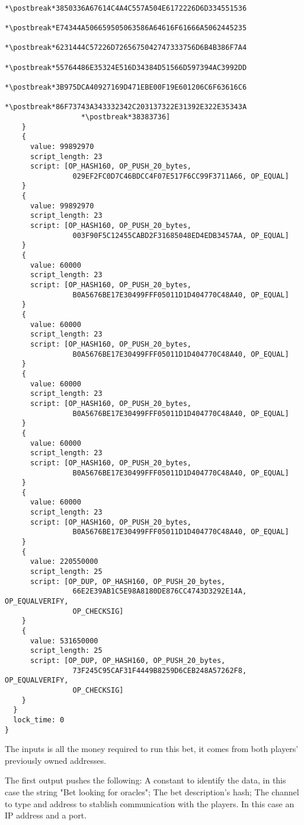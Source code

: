 \begin{lstlisting}
                  *\postbreak*3850336A67614C4A4C557A504E6172226D6D334551536
                  *\postbreak*E74344A506659505063586A64616F61666A5062445235
                  *\postbreak*6231444C57226D7265675042747333756D6B4B386F7A4
                  *\postbreak*55764486E35324E516D34384D51566D597394AC3992DD
                  *\postbreak*3B975DCA40927169D471EBE00F19E601206C6F63616C6
                  *\postbreak*86F73743A343332342C203137322E31392E322E35343A
                  *\postbreak*38383736]
    }
    {
      value: 99892970
      script_length: 23
      script: [OP_HASH160, OP_PUSH_20_bytes,
                029EF2FC0D7C46BDCC4F07E517F6CC99F3711A66, OP_EQUAL]
    }
    {
      value: 99892970
      script_length: 23
      script: [OP_HASH160, OP_PUSH_20_bytes,
                003F90F5C12455CABD2F31685048ED4EDB3457AA, OP_EQUAL]
    }
    {
      value: 60000
      script_length: 23
      script: [OP_HASH160, OP_PUSH_20_bytes,
                B0A5676BE17E30499FFF05011D1D404770C48A40, OP_EQUAL]
    }
    {
      value: 60000
      script_length: 23
      script: [OP_HASH160, OP_PUSH_20_bytes,
                B0A5676BE17E30499FFF05011D1D404770C48A40, OP_EQUAL]
    }
    {
      value: 60000
      script_length: 23
      script: [OP_HASH160, OP_PUSH_20_bytes,
                B0A5676BE17E30499FFF05011D1D404770C48A40, OP_EQUAL]
    }
    {
      value: 60000
      script_length: 23
      script: [OP_HASH160, OP_PUSH_20_bytes,
                B0A5676BE17E30499FFF05011D1D404770C48A40, OP_EQUAL]
    }
    {
      value: 60000
      script_length: 23
      script: [OP_HASH160, OP_PUSH_20_bytes,
                B0A5676BE17E30499FFF05011D1D404770C48A40, OP_EQUAL]
    }
    {
      value: 220550000
      script_length: 25
      script: [OP_DUP, OP_HASH160, OP_PUSH_20_bytes,
                66E2E39AB1C5E98A8180DE876CC4743D3292E14A, OP_EQUALVERIFY,
                OP_CHECKSIG]
    }
    {
      value: 531650000
      script_length: 25
      script: [OP_DUP, OP_HASH160, OP_PUSH_20_bytes,
                73F245C95CAF31F4449B8259D6CEB248A57262F8, OP_EQUALVERIFY,
                OP_CHECKSIG]
    }
  }
  lock_time: 0
}
\end{lstlisting}

The inputs is all the money required to run this bet, it comes from both
  players' previously owned addresses.

The first output pushes the following: A constant to identify the data, in this
  case the string "Bet looking for oracles"; The bet description's hash; The
  channel to type and address to stablish communication with the players. In
  this case an IP address and a port.

